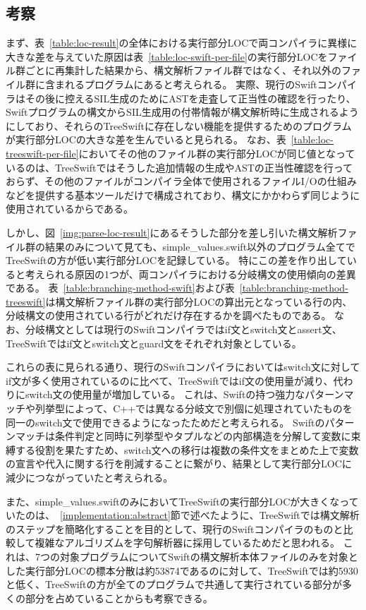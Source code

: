 \subsection{考察}

まず、表~\ref{table:loc-result}の全体における実行部分LOCで両コンパイラに異様に大きな差を与えていた原因は表~\ref{table:loc-swift-per-file}の実行部分LOCをファイル群ごとに再集計した結果から、構文解析ファイル群ではなく、それ以外のファイル群に含まれるプログラムにあると考えられる。
実際、現行のSwiftコンパイラはその後に控えるSIL生成のためにASTを走査して正当性の確認を行ったり、Swiftプログラムの構文からSIL生成用の付帯情報が構文解析時に生成されるようにしており、それらのTreeSwiftに存在しない機能を提供するためのプログラムが実行部分LOCの大きな差を生んでいると見られる。
なお、表~\ref{table:loc-treeswift-per-file}においてその他のファイル群の実行部分LOCが同じ値となっているのは、TreeSwiftではそうした追加情報の生成やASTの正当性確認を行っておらず、その他のファイルがコンパイラ全体で使用されるファイルI/Oの仕組みなどを提供する基本ツールだけで構成されており、構文にかかわらず同じように使用されているからである。

しかし、図~\ref{img:parse-loc-result}にあるそうした部分を差し引いた構文解析ファイル群の結果のみについて見ても、simple\_values.swift以外のプログラム全てでTreeSwiftの方が低い実行部分LOCを記録している。
特にこの差を作り出していると考えられる原因の1つが、両コンパイラにおける分岐構文の使用傾向の差異である。
表~\ref{table:branching-method-swift}および表~\ref{table:branching-method-treeswift}は構文解析ファイル群の実行部分LOCの算出元となっている行の内、分岐構文の使用されている行がどれだけ存在するかを調べたものである。
なお、分岐構文としては現行のSwiftコンパイラではif文とswitch文とassert文、TreeSwiftではif文とswitch文とguard文をそれぞれ対象としている。

これらの表に見られる通り、現行のSwiftコンパイラにおいてはswitch文に対してif文が多く使用されているのに比べて、TreeSwiftではif文の使用量が減り、代わりにswitch文の使用量が増加している。
これは、Swiftの持つ強力なパターンマッチや列挙型によって、C++では異なる分岐文で別個に処理されていたものを同一のswitch文で使用できるようになったためだと考えられる。
Swiftのパターンマッチは条件判定と同時に列挙型やタプルなどの内部構造を分解して変数に束縛する役割を果たすため、switch文への移行は複数の条件文をまとめた上で変数の宣言や代入に関する行を削減することに繋がり、結果として実行部分LOCに減少につながっていたと考えられる。

また、simple\_values.swiftのみにおいてTreeSwiftの実行部分LOCが大きくなっていたのは、~\ref{implementation:abstract}節で述べたように、TreeSwiftでは構文解析のステップを簡略化することを目的として、現行のSwiftコンパイラのものと比較して複雑なアルゴリズムを字句解析器に採用しているためだと思われる。
これは、7つの対象プログラムについてSwiftの構文解析本体ファイルのみを対象とした実行部分LOCの標本分散は約53874であるのに対して、TreeSwiftでは約5930と低く、TreeSwiftの方が全てのプログラムで共通して実行されている部分が多くの部分を占めていることからも考察できる。

